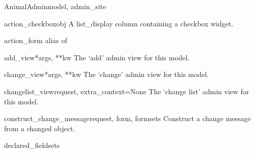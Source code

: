 \documentclass[letterpaper,10pt,english]{sphinxmanual}
\begin{document}
\hypertarget{animal.admin.AnimalAdmin}{}\begin{classdesc}{AnimalAdmin}{model, admin\_site}~

\hypertarget{animal.admin.AnimalAdmin.action_checkbox}{}\begin{methoddesc}{action\_checkbox}{obj}
A list\_display column containing a checkbox widget.
\end{methoddesc}

\hypertarget{animal.admin.AnimalAdmin.action_form}{}\begin{memberdesc}{action\_form}
alias of 
\end{memberdesc}

\hypertarget{animal.admin.AnimalAdmin.add_view}{}\begin{methoddesc}{add\_view}{*args, **kw}
The `add' admin view for this model.
\end{methoddesc}

\hypertarget{animal.admin.AnimalAdmin.change_view}{}\begin{methoddesc}{change\_view}{*args, **kw}
The `change' admin view for this model.
\end{methoddesc}

\hypertarget{animal.admin.AnimalAdmin.changelist_view}{}\begin{methoddesc}{changelist\_view}{request, extra\_context=None}
The `change list' admin view for this model.
\end{methoddesc}

\hypertarget{animal.admin.AnimalAdmin.construct_change_message}{}\begin{methoddesc}{construct\_change\_message}{request, form, formsets}
Construct a change message from a changed object.
\end{methoddesc}

\hypertarget{animal.admin.AnimalAdmin.declared_fieldsets}{}\begin{memberdesc}{declared\_fieldsets}\end{memberdesc}


\end{classdesc}
\end{document}
